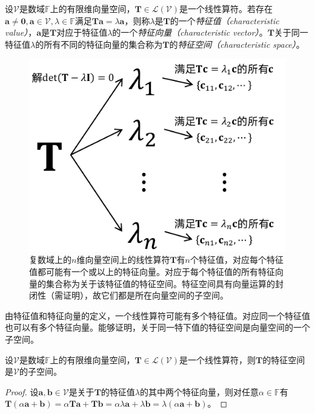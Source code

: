 \documentclass[main.tex]{subfiles}
\begin{document}
\begin{definition}\label{def:II.2.21}
    设$\mathcal{V}$是数域$\mathbb{F}$上的有限维向量空间，$\mathbf{T}\in\mathcal{L}\left(\mathcal{V}\right)$是一个线性算符。若存在$\mathbf{a}\neq\mathbf{0},\mathbf{a}\in\mathcal{V},\lambda\in\mathbb{F}$满足$\mathbf{Ta}=\lambda\mathbf{a}$，则称$\lambda$是$\mathbf{T}$的一个\emph{特征值（characteristic value）}，$\mathbf{a}$是$\mathbf{T}$对应于特征值$\lambda$的一个\emph{特征向量（characteristic vector）}。$\mathbf{T}$关于同一特征值$\lambda$的所有不同的特征向量的集合称为$\mathbf{T}$的\emph{特征空间（characteristic space）}。
\end{definition}

\begin{figure}[htbp]
    \centering
    \includegraphics{images/characteristic_values.pdf}
    \caption{复数域上的$n$维向量空间上的线性算符$\mathbf{T}$有$n$个特征值，对应每个特征值都可能有一个或以上的特征向量。对应于每个特征值的所有特征向量的集合称为关于该特征值的特征空间。特征空间具有向量运算的封闭性（需证明），故它们都是所在向量空间的子空间。}
    \label{fig:II.2.3}
\end{figure}

由特征值和特征向量的定义，一个线性算符可能有多个特征值。对应同一个特征值也可以有多个特征向量。能够证明，关于同一特下值的特征空间是向量空间的一个子空间。

\begin{theorem}\label{thm:II.2.26}
    设$\mathcal{V}$是数域$\mathbb{F}$上的有限维向量空间，$\mathbf{T}\in\mathcal{L}\left(\mathcal{V}\right)$是一个线性算符，则$\mathbf{T}$的特征空间是$\mathcal{V}$的子空间。
\end{theorem}
\begin{proof}
    设$\mathbf{a},\mathbf{b}\in\mathcal{V}$是关于$\mathbf{T}$的特征值$\lambda$的其中两个特征向量，则对任意$\alpha\in\mathbb{F}$有$\mathbf{T}\left(\alpha\mathbf{a}+\mathbf{b}\right)=\alpha\mathbf{Ta}+\mathbf{Tb}=\alpha\lambda\mathbf{a}+\lambda\mathbf{b}=\lambda\left(\alpha\mathbf{a}+\mathbf{b}\right)$。
\end{proof}
\end{document}

